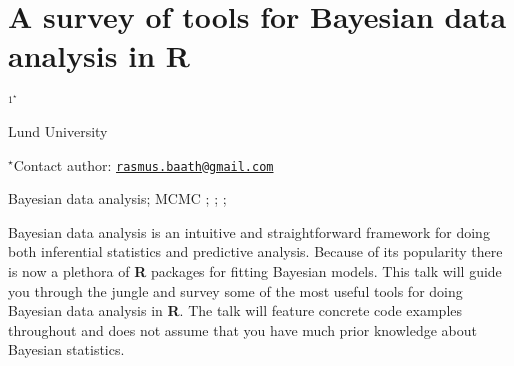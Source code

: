\documentclass[\main/boa.tex]{subfiles}
\begin{document}
\section{A survey of tools for Bayesian data analysis in R}

\begin{center}
  {\bf {}$^{1^\star}$}
\end{center}

\vskip 0.3cm

\begin{affiliations}
\begin{enumerate}
\begin{minipage}{0.915\textwidth}
\centering
\item Lund University \\[-2pt]
\end{minipage}
\end{enumerate}
$^\star$Contact author: \href{mailto:rasmus.baath@gmail.com}{\nolinkurl{rasmus.baath@gmail.com}}\\
\end{affiliations}

\vskip 0.5cm

\begin{minipage}{0.915\textwidth}
\keywords Bayesian data analysis; MCMC
\packages {}; ; ; 
\end{minipage}

\vskip 0.8cm

Bayesian data analysis is an intuitive and straightforward framework for
doing both inferential statistics and predictive analysis. Because of
its popularity there is now a plethora of \textbf{R} packages for
fitting Bayesian models. This talk will guide you through the jungle and
survey some of the most useful tools for doing Bayesian data analysis in
\textbf{R}. The talk will feature concrete code examples throughout and
does not assume that you have much prior knowledge about Bayesian
statistics.
\end{document}
